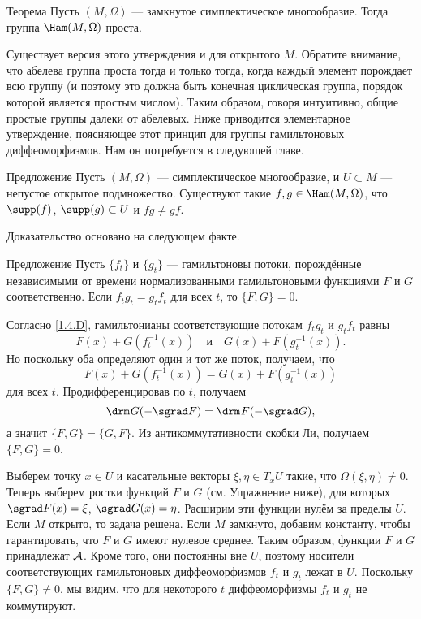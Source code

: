 \begin{thm}{Теорема}\label{1.5.A}
Пусть $(M, \Omega)$ --- замкнутое симплектическое многообразие.
Тогда группа $\Ham (M, \Omega)$ проста.
\end{thm}

Существует версия этого утверждения и для открытого $M$.
Обратите внимание, что абелева группа проста тогда и только тогда, когда каждый элемент порождает всю группу (и поэтому это должна быть конечная циклическая группа, порядок которой является простым числом).
Таким образом, говоря интуитивно, общие простые группы далеки от абелевых.
Ниже приводится элементарное утверждение, поясняющее этот принцип для группы гамильтоновых диффеоморфизмов.
Нам он потребуется в следующей главе.

\begin{thm}{Предложение}\label{1.5.B}
Пусть $(M, \Omega)$ --- симплектическое многообразие, и $U \subset M$ --- непустое открытое подмножество.
Существуют такие $f, g \in \Ham (M, \Omega)$, что $\supp (f)$, $\supp (g) \subset U$ и $f g \ne gf$.
\end{thm}

Доказательство основано на следующем факте.

\begin{thm}{Предложение}\label{1.5.C}
Пусть $\{f_t\}$ и $\{g_t\}$ --- гамильтоновы потоки, порождённые независимыми от времени нормализованными гамильтоновыми функциями $F$ и $G$ соответственно.
Если $f_t g_t = g_t f_t$ для всех $t$, то $\{F, G\} = 0$.
\end{thm}

Согласно \ref{1.4.D}, гамильтонианы соответствующие потокам $f_t g_t$ и $g_t f_t$ равны
\[F(x)+G(f_t^{-1} (x))
\quad\text{и}\quad
G (x) + F (g_t^{-1}(x)).
\]
Но поскольку оба определяют один и тот же поток, получаем, что 
\[F (x) + G (f_t^{-1} (x)) = G (x) + F (g_t^{-1} (x))\]
для всех $t$.
Продифференцировав по $t$, получаем
\[\d G(-\sgrad F)=\d F(-\sgrad G),\]
а значит $\{F, G\} = \{G, F\}$.
Из антикоммутативности скобки Ли, получаем $\{F, G\} = 0$.

Выберем точку $x\in U$ и касательные векторы $\xi, \eta \in T_x U$ такие, что $\Omega (\xi, \eta) \ne 0$.
Теперь выберем ростки функций $F$ и $G$ (см. Упражнение ниже), для которых $\sgrad F (x) = \xi$, $\sgrad G (x) = \eta$.
Расширим эти функции нулём за пределы $U$.
Если $M$ открыто, то задача решена.
Если $M$ замкнуто, добавим константу, чтобы гарантировать, что $F$ и $G$ имеют нулевое среднее.
Таким образом, функции $F$ и $G$ принадлежат $\mathcal{A}$.
Кроме того, они постоянны вне $U$, поэтому носители соответствующих гамильтоновых диффеоморфизмов $f_t$ и $g_t$ лежат в $U$.
Поскольку $\{F, G\} \ne 0$, мы видим, что для некоторого $t$ диффеоморфизмы $f_t$ и $g_t$ не коммутируют.

